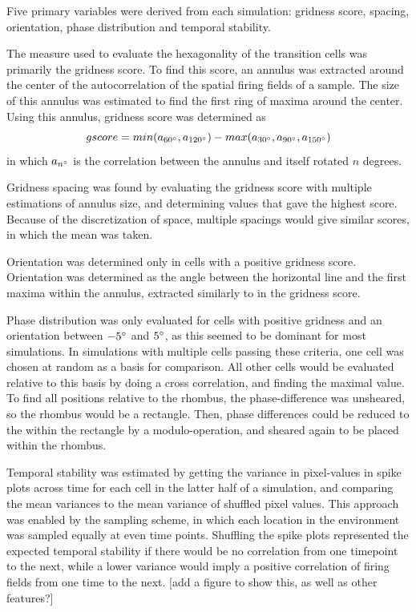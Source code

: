 \documentclass{article}
\begin{document}
    Five primary variables were derived from each simulation: gridness score, spacing, orientation, phase distribution and temporal stability.
    
    The measure used to evaluate the hexagonality of the transition cells was primarily the gridness score. To find this score, an annulus was extracted around the center of the autocorrelation of the spatial firing fields of a sample. The size of this annulus was estimated to find the first ring of maxima around the center. Using this annulus, gridness score was determined as \[gscore = min(a_{60\degree}, a_{120\degree}) - max(a_{30\degree}, a_{90\degree}, a_{150\degree})\] in which \(a_{n\degree}\) is the correlation between the annulus and itself rotated \(n\) degrees.

    Gridness spacing was found by evaluating the gridness score with multiple estimations of annulus size, and determining values that gave the highest score. Because of the discretization of space, multiple spacings would give similar scores, in which the mean was taken.

    Orientation was determined only in cells with a positive gridness score. Orientation was determined as the angle between the horizontal line and the first maxima within the annulus, extracted similarly to in the gridness score.

    Phase distribution was only evaluated for cells with positive gridness and an orientation between \(-5\degree\) and \(5\degree\), as this seemed to be dominant for most simulations. In simulations with multiple cells passing these criteria, one cell was chosen at random as a basis for comparison. All other cells would be evaluated relative to this basis by doing a cross correlation, and finding the maximal value. To find all positions relative to the rhombus, the phase-difference was unsheared, so the rhombus would be a rectangle. Then, phase differences could be reduced to the within the rectangle by a modulo-operation, and sheared again to be placed within the rhombus.
    
    Temporal stability was estimated by getting the variance in pixel-values in spike plots across time for each cell in the latter half of a simulation, and comparing the mean variances to the mean variance of shuffled pixel values. This approach was enabled by the sampling scheme, in which each location in the environment was sampled equally at even time points. Shuffling the spike plots represented the expected temporal stability if there would be no correlation from one timepoint to the next, while a lower variance would imply a positive correlation of firing fields from one time to the next. [add a figure to show this, as well as other features?]
\end{document}

